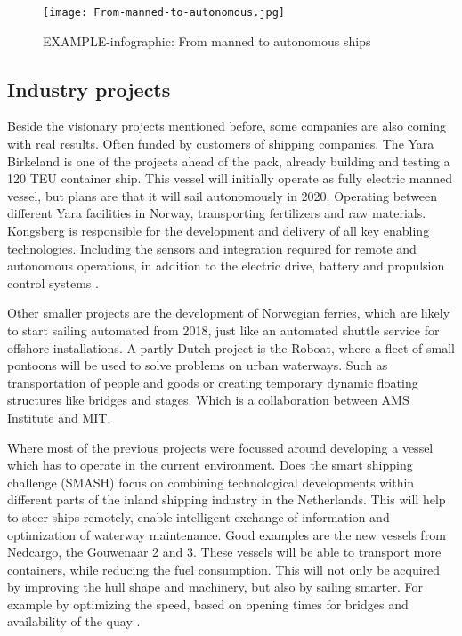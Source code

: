 \begin{figure}[b]
	\centering
	\texttt{[image: From-manned-to-autonomous.jpg]}
	\caption{EXAMPLE-infographic: From manned to autonomous ships}
	\label{fig:From-manned-to-autonomous}
\end{figure}




\subsection{Industry projects}
Beside the visionary projects mentioned before, some companies are also coming with real results. Often funded by customers of shipping companies.
The Yara Birkeland is one of the projects ahead of the pack, already building and testing a 120 \ac{TEU} container ship. This vessel will initially operate as fully electric manned vessel, but plans are that it will sail autonomously in 2020. Operating between different Yara facilities in Norway, transporting fertilizers and raw materials. 
Kongsberg is responsible for the development and delivery of all key enabling technologies. Including the sensors and integration required for remote and autonomous operations, in addition to the electric drive, battery and propulsion control systems \cite{Sames2017}.

Other smaller projects are the development of Norwegian ferries, which are likely to start sailing automated from 2018, just like an automated shuttle service for offshore installations. A partly Dutch project is the Roboat, where a fleet of small pontoons will be used to solve problems on urban waterways. Such as transportation of people and goods or creating temporary dynamic floating structures like bridges and stages. Which is a collaboration between AMS Institute and MIT.

Where most of the previous projects were focussed around developing a vessel which has to operate in the current environment. Does the smart shipping challenge (SMASH) focus on combining technological developments within different parts of the inland shipping industry in the Netherlands. This will help to steer ships remotely, enable intelligent exchange of information and optimization of waterway maintenance.
Good examples are the new vessels from Nedcargo, the Gouwenaar 2 and 3. These vessels will be able to transport more containers, while reducing the fuel consumption. This will not only be acquired by improving the hull shape and machinery, but also by sailing smarter. For example by optimizing the speed, based on opening times for bridges and availability of the quay \cite{SMASH2017}. 

